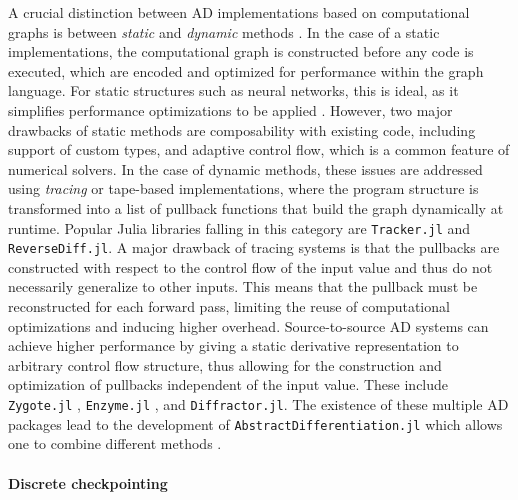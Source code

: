 A crucial distinction between AD implementations based on computational graphs is between \textit{static} and \textit{dynamic} methods \cite{Baydin_Pearlmutter_Radul_Siskind_2015}. 
In the case of a static implementations, the computational graph is constructed before any code is executed, which are encoded and optimized for performance within the graph language. 
For static structures such as neural networks, this is ideal, as it simplifies performance optimizations to be applied \cite{abadi-tensorflow}. 
However, two major drawbacks of static methods are composability with existing code, including support of custom types, and adaptive control flow, which is a common feature of numerical solvers. 
In the case of dynamic methods, these issues are addressed using \textit{tracing} or tape-based implementations, where the program structure is transformed into a list of pullback functions that build the graph dynamically at runtime. 
Popular Julia libraries falling in this category are \texttt{Tracker.jl} and \texttt{ReverseDiff.jl}. 
A major drawback of tracing systems is that the pullbacks are constructed with respect to the control flow of the input value and thus do not necessarily generalize to other inputs. 
This means that the pullback must be reconstructed for each forward pass, limiting the reuse of computational optimizations and inducing higher overhead. 
Source-to-source AD systems can achieve higher performance by giving a static derivative representation to arbitrary control flow structure, thus allowing for the construction and optimization of pullbacks independent of the input value. 
These include \texttt{Zygote.jl} \cite{Innes_Zygote}, \texttt{Enzyme.jl} \cite{moses_Enzyme, Moses.2021}, and \texttt{Diffractor.jl}.
The existence of these multiple AD packages lead to the development of \texttt{AbstractDifferentiation.jl} which allows one to combine different methods \cite{Schäfer_Tarek_White_Rackauckas_2021}. 


\paragraph{Discrete checkpointing}
\label{section:checkpointing}

